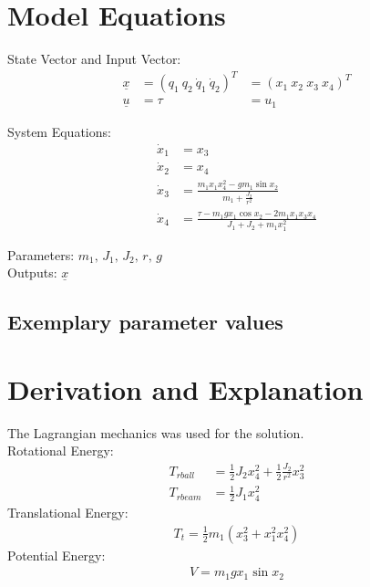 \documentclass[10pt,a4paper]{article}
\begin{document}
	
	\section{Model Equations} %
	
	State Vector and Input Vector:
	\begin{align*}
		\underline{x} &= (q_1 \ q_2 \ \dot{q}_1 \ \dot{q}_2)^T &= (x_1 \ x_2 \ x_3 \ x_4)^T\\
		\underline{u} &= \tau &= u_1  
	\end{align*}
	
	\noindent System Equations:			
	\begin{subequations}
	\begin{align}
		\dot{x}_1 &= x_3 \\
		\dot{x}_2 &= x_4 \\
		\dot{x}_3 &= \frac{m_1x_1x_4^2 - gm_1\sin x_2}{m_1 + \frac{J_2}{r^2}}\\
		\dot{x}_4 &= \frac{\tau - m_1gx_1 \cos x_2 - 2m_1x_1x_3x_4}{J_1 + J_2 + m_1x_1^2}		
	\end{align}
	\end{subequations}

	\noindent
	Parameters:  $m_1, \, J_1 , \, J_2, \, r, \, g$ %
	\\
	Outputs: $\underline{x}$ 
	
	
	
	\subsection{Exemplary parameter values}
	

	
	\section{Derivation and Explanation} %
	The Lagrangian mechanics was used for the solution. \\
	Rotational Energy: 
	\begin{align}
		T_{rball} &= \frac{1}{2}J_2x_4^2 + \frac{1}{2} \frac{J_2}{r^2} x_3^2 \\
		T_{rbeam} &= \frac{1}{2}J_1x_4^2
	\end{align}
	Translational Energy: 
	\begin{align}
		T_{t} = \frac{1}{2}m_1(x_3^2 + x_1^2x_4^2)
	\end{align}
	Potential Energy: 
	\begin{align}
		V = m_1gx_1 \sin x_2
	\end{align}
	
\end{document}
